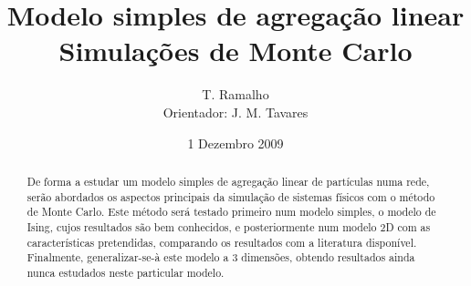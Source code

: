 \documentclass[a4paper,10pt]{article}
\title{{\bfseries Modelo simples de agregação linear}\\Simulações de Monte Carlo}
\author{T. Ramalho\\Orientador: J. M. Tavares}
\date{1 Dezembro 2009}
\begin{document}
\maketitle

\begin{abstract}
De forma a estudar um modelo simples de agregação linear de partículas numa rede, serão abordados os aspectos principais da simulação de sistemas físicos com o método de Monte Carlo. Este método será testado primeiro num modelo simples, o modelo de Ising, cujos resultados são bem conhecidos, e posteriormente num modelo 2D com as características pretendidas, comparando os resultados com a literatura disponível. Finalmente, generalizar-se-à este modelo a 3 dimensões, obtendo resultados ainda nunca estudados neste particular modelo.
\end{abstract}
\end{document}
